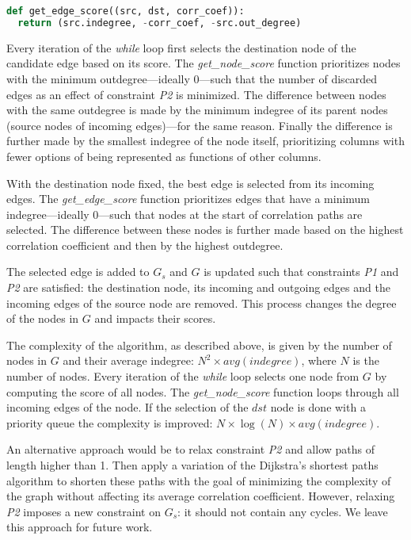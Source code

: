 \begin{lstlisting}[language=Python,
label={lst:ps:corr:edgescore},
caption={get\_edge\_score}]
def get_edge_score((src, dst, corr_coef)):
  return (src.indegree, -corr_coef, -src.out_degree)
\end{lstlisting}
\bigskip

Every iteration of the \textit{while} loop first selects the destination node of the candidate edge based on its score. The \textit{get\_node\_score} function prioritizes nodes with the minimum outdegree---ideally 0---such that the number of discarded edges as an effect of constraint \textit{P2} is minimized. The difference between nodes with the same outdegree is made by the minimum indegree of its parent nodes (source nodes of incoming edges)---for the same reason. Finally the difference is further made by the smallest indegree of the node itself, prioritizing columns with fewer options of being represented as functions of other columns. 

With the destination node fixed, the best edge is selected from its incoming edges. The \textit{get\_edge\_score} function prioritizes edges that have a minimum indegree---ideally 0---such that nodes at the start of correlation paths are selected. The difference between these nodes is further made based on the highest correlation coefficient and then by the highest outdegree.

The selected edge is added to \(G_{s}\) and \(G\) is updated such that constraints \textit{P1} and \textit{P2} are satisfied: the destination node, its incoming and outgoing edges and the incoming edges of the source node are removed. This process changes the degree of the nodes in \(G\) and impacts their scores.

The complexity of the algorithm, as described above, is given by the number of nodes in \(G\) and their average indegree: \(N^2 \times avg(indegree)\), where \(N\) is the number of nodes. Every iteration of the \textit{while} loop selects one node from \(G\) by computing the score of all nodes. The \textit{get\_node\_score} function loops through all incoming edges of the node. If the selection of the \(dst\) node is done with a priority queue the complexity is improved: \(N \times \log(N) \times avg(indegree)\).

An alternative approach would be to relax constraint \textit{P2} and allow paths of length higher than 1. Then apply a variation of the Dijkstra's shortest paths algorithm to shorten these paths with the goal of minimizing the complexity of the graph without affecting its average correlation coefficient. However, relaxing  \textit{P2} imposes a new constraint on \(G_{s}\): it should not contain any cycles. We leave this approach for future work.

